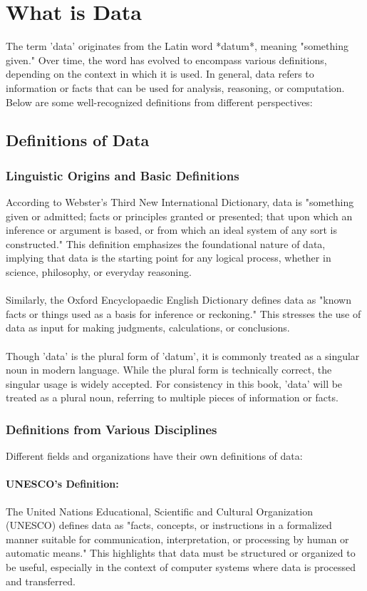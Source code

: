 \documentclass[12pt, oneside]{book}
\begin{document}
\section{What is Data}
The term 'data' originates from the Latin word *datum*, meaning "something given." Over time, the word has evolved to encompass various definitions, depending on the context in which it is used. In general, data refers to information or facts that can be used for analysis, reasoning, or computation. Below are some well-recognized definitions from different perspectives:\\
\subsection{Definitions of Data}
\subsubsection{Linguistic Origins and Basic Definitions}
According to Webster's Third New International Dictionary, data is "something given or admitted; facts or principles granted or presented; that upon which an inference or argument is based, or from which an ideal system of any sort is constructed." This definition emphasizes the foundational nature of data, implying that data is the starting point for any logical process, whether in science, philosophy, or everyday reasoning.\\\\
Similarly, the Oxford Encyclopaedic English Dictionary defines data as "known facts or things used as a basis for inference or reckoning." This stresses the use of data as input for making judgments, calculations, or conclusions.\\\\
Though 'data' is the plural form of 'datum', it is commonly treated as a singular noun in modern language. While the plural form is technically correct, the singular usage is widely accepted. For consistency in this book, 'data' will be treated as a plural noun, referring to multiple pieces of information or facts.\\
\subsubsection{Definitions from Various Disciplines}

Different fields and organizations have their own definitions of data:

\paragraph{UNESCO's Definition:} 
The United Nations Educational, Scientific and Cultural Organization (UNESCO) defines data as "facts, concepts, or instructions in a formalized manner suitable for communication, interpretation, or processing by human or automatic means." This highlights that data must be structured or organized to be useful, especially in the context of computer systems where data is processed and transferred.\\
\end{document}
